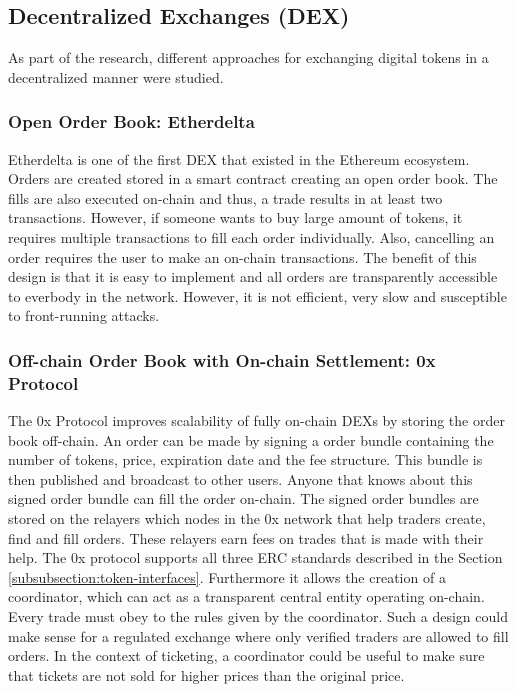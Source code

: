 \subsection{Decentralized Exchanges (DEX)}\label{subsection:dex}

As part of the research, different approaches for exchanging digital tokens in a decentralized manner were studied.

\subsubsection{Open Order Book: Etherdelta}
Etherdelta is one of the first DEX that existed in the Ethereum ecosystem. Orders are created stored in a smart contract creating an open order book. The fills are also executed on-chain and thus, a trade results in at least two transactions. However, if someone wants to buy large amount of tokens, it requires multiple transactions to fill each order individually. Also, cancelling an order requires the user to make an on-chain transactions. The benefit of this design is that it is easy to implement and all orders are transparently accessible to everbody in the network. However, it is not efficient, very slow and susceptible to front-running attacks. 

\subsubsection{Off-chain Order Book with On-chain Settlement: 0x Protocol}

The 0x Protocol improves scalability of fully on-chain DEXs by storing the order book off-chain. An order can be made by signing a order bundle containing the number of tokens, price, expiration date and the fee structure. This bundle is then published and broadcast to other users. Anyone that knows about this signed order bundle can fill the order on-chain. The signed order bundles are stored on the relayers which nodes in the 0x network that help traders create, find and fill orders. These relayers earn fees on trades that is made with their help. The 0x protocol supports all three ERC standards described in the Section \ref{subsubsection:token-interfaces}. Furthermore it allows the creation of a coordinator, which can act as a transparent central entity operating on-chain. Every trade must obey to the rules given by the coordinator. Such a design could make sense for a regulated exchange where only verified traders are allowed to fill orders. In the context of ticketing, a coordinator could be useful to make sure that tickets are not sold for higher prices than the original price. 

